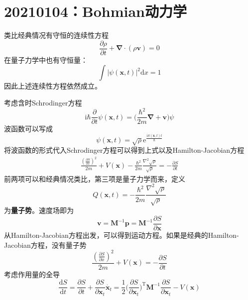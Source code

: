 \documentclass[12pt]{article}
\begin{document}
\section{20210104：Bohmian动力学}

    类比经典情况有守恒的连续性方程
    \begin{equation}
        \frac {\partial \rho}{\partial t} + \bm{\nabla} \cdot (\rho \bm{v}) = 0
    \end{equation}
    在量子力学中也有守恒量：
    \begin{equation}
        \int |\psi(\bm{x},t)|^2 \mathrm{d}x = 1
    \end{equation}
    因此上述连续性方程依然成立。

    考虑含时Schrodinger方程
    \begin{equation}
        \mathrm{i}\hbar \frac {\partial}{\partial t} \psi(\bm{x},t) = \bigg(\frac {\hbar^2}{2m}\bm{\nabla + \bm{v}}\bigg)\psi
    \end{equation}
    波函数可以写成
    \begin{equation}
        \psi(\bm{x},t) = \sqrt{\rho} \mathrm{e}^{\frac {\mathrm{i}S(\bm{x},t)t}{\hbar}}
    \end{equation}
    将波函数的形式代入Schrodinger方程可以得到上式以及Hamilton-Jacobian方程
    \begin{equation}\begin{aligned}
        \frac {(\frac {\partial S}{\partial x})^2}{2m} + V(\bm{x}) - \frac {\hbar^2}{2m} \frac {\nabla^2 \sqrt{\rho}}{\sqrt{\rho}} = -\frac {\partial S}{\partial t}
    \end{aligned}\end{equation}
    前两项可以和经典情况类比，第三项是量子力学而来，定义
    \begin{equation}
        Q(\bm{x},t) = - \frac {\hbar^2}{2m} \frac {\nabla^2 \sqrt{\rho}}{\sqrt{\rho}}
    \end{equation}
    为\textbf{量子势}。速度场即为
    \begin{equation}
        \bm{v} = \bm{M}^{-1}\bm{p} = \bm{M}^{-1}\frac {\partial S}{\partial \bm{x}}
    \end{equation}
    从Hamilton-Jacobian方程出发，可以得到运动方程。如果是经典的Hamilton-Jacobian方程，没有量子势
    \begin{equation}
        \frac {(\frac {\partial S}{\partial x})^2}{2m} + V(\bm{x}) = -\frac {\partial S}{\partial t}
    \end{equation}
    考虑作用量的全导
    \begin{equation}
        \frac {\mathrm{d}S}{\mathrm{d}t} = \frac {\partial S}{\partial t} + \frac {\partial S}{\partial \bm{x}_t} \dot{\bm{x}_t} = \frac 12 \bigg(\frac {\partial S}{\partial \bm{x}_t}\bigg)^{\mathrm{T}} \bm{M}^{-1} \frac {\partial S}{\partial \bm{x}_t} - V(\bm{x})
    \end{equation}
\end{document}
